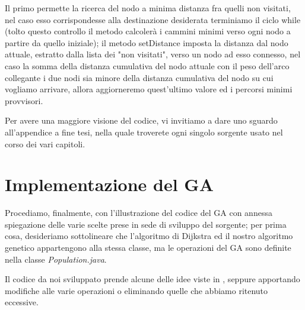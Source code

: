 Il primo permette la ricerca del nodo a minima distanza fra quelli non visitati, nel caso esso corrispondesse alla destinazione desiderata terminiamo il ciclo while (tolto questo controllo il metodo calcoler\`a i cammini minimi verso ogni nodo a partire da quello iniziale); il metodo setDistance imposta la distanza dal nodo attuale, estratto dalla lista dei "non visitati", verso un nodo ad esso connesso, nel caso la somma della distanza cumulativa del nodo attuale con il peso dell'arco collegante i due nodi sia minore della distanza cumulativa del nodo su cui vogliamo arrivare, allora aggiorneremo quest'ultimo valore ed i percorsi minimi provvisori.

Per avere una maggiore visione del codice, vi invitiamo a dare uno sguardo all'appendice a fine tesi, nella quale troverete ogni singolo sorgente usato nel corso dei vari capitoli.
\section{Implementazione del GA}
Procediamo, finalmente, con l'illustrazione del codice del GA con annessa spiegazione delle varie scelte prese in sede di sviluppo del sorgente; per prima cosa, desideriamo sottolineare che l'algoritmo di Dijkstra ed il nostro algoritmo genetico appartengono alla stessa classe, ma le operazioni del GA sono definite nella classe \textit{Population.java}.

Il codice da noi sviluppato prende alcune delle idee viste in \cite{path3}, seppure apportando modifiche alle varie operazioni o eliminando quelle che abbiamo ritenuto eccessive.
\vspace{3mm}

